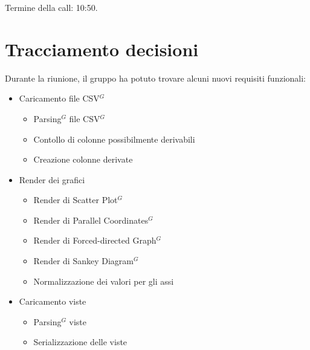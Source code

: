 \noindent Termine della call: 10:50.

\section{Tracciamento decisioni}


\noindent Durante la riunione, il gruppo ha potuto trovare alcuni nuovi requisiti funzionali: 
\begin{itemize}
	\item Caricamento file CSV$^{G}$
	\begin{itemize}
		\item Parsing$^{G}$ file CSV$^{G}$
		\item Contollo di colonne possibilmente derivabili
		\item Creazione colonne derivate
	\end{itemize}
	\item Render dei grafici
	\begin{itemize}
		\item Render di Scatter Plot$^{G}$
		\item Render di Parallel Coordinates$^{G}$
		\item Render di Forced-directed Graph$^{G}$
		\item Render di Sankey Diagram$^{G}$
		\item Normalizzazione dei valori per gli assi
	\end{itemize}
	\item Caricamento viste
	\begin{itemize}
		\item Parsing$^{G}$ viste
		\item Serializzazione delle viste
	\end{itemize}
\end{itemize}
